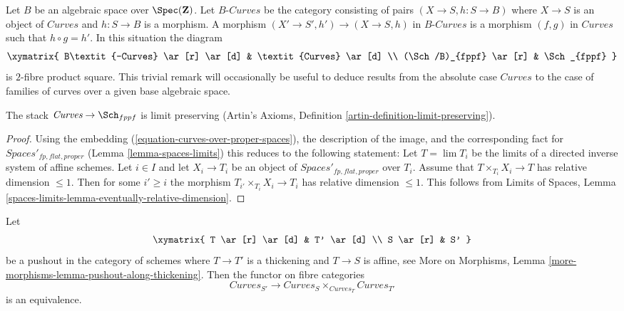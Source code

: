 \begin{remark}
\label{remark-curves-base-change}
Let $B$ be an algebraic space over $\Spec(\mathbf{Z})$.
Let $B\textit{-Curves}$ be the category consisting
of pairs $(X \to S, h : S \to B)$
where $X \to S$ is an object of
$\textit{Curves}$ and $h : S \to B$ is a morphism.
A morphism $(X' \to S', h') \to (X \to S, h)$
in $B\textit{-Curves}$ is a morphism $(f, g)$
in $\textit{Curves}$ such that $h \circ g = h'$.
In this situation the diagram
$$
\xymatrix{
B\textit{-Curves} \ar[r] \ar[d] & \textit{Curves} \ar[d] \\
(\Sch/B)_{fppf} \ar[r] & \Sch_{fppf}
}
$$
is $2$-fibre product square. This trivial remark
will occasionally be useful to deduce results from
the absolute case $\textit{Curves}$ to the case
of families of curves over a given base algebraic space.
\end{remark}

\begin{lemma}
\label{lemma-curves-limits}
The stack $\textit{Curves} \to \Sch_{fppf}$ is limit preserving
(Artin's Axioms, Definition \ref{artin-definition-limit-preserving}).
\end{lemma}

\begin{proof}
Using the embedding (\ref{equation-curves-over-proper-spaces}),
the description of the image, and
the corresponding fact for $\textit{Spaces}'_{fp, flat, proper}$
(Lemma \ref{lemma-spaces-limits})
this reduces to the following statement:
Let $T = \lim T_i$ be the limits of a
directed inverse system of affine schemes.
Let $i \in I$ and let $X_i \to T_i$ be an object of
$\textit{Spaces}'_{fp, flat, proper}$ over $T_i$.
Assume that $T \times_{T_i} X_i \to T$ has
relative dimension $\leq 1$.
Then for some $i' \geq i$ the morphism
$T_{i'} \times_{T_i} X_i \to T_i$ has
relative dimension $\leq 1$. This follows from
Limits of Spaces, Lemma
\ref{spaces-limits-lemma-eventually-relative-dimension}.
\end{proof}

\begin{lemma}
\label{lemma-curves-RS-star}
Let
$$
\xymatrix{
T \ar[r] \ar[d] & T' \ar[d] \\
S \ar[r] & S'
}
$$
be a pushout in the category of schemes where
$T \to T'$ is a thickening and $T \to S$ is affine, see
More on Morphisms, Lemma \ref{more-morphisms-lemma-pushout-along-thickening}.
Then the functor on fibre categories
$$
\textit{Curves}_{S'}
\longrightarrow
\textit{Curves}_S
\times_{\textit{Curves}_T}
\textit{Curves}_{T'}
$$
is an equivalence.
\end{lemma}

